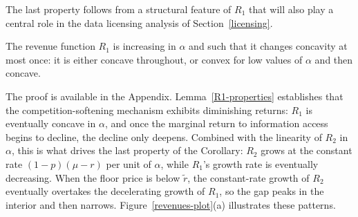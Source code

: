 \noindent The last property follows from a structural feature of $R_1$ that will also play a central role in the data licensing analysis of Section~\ref{licensing}.

\begin{lem}\label{R1-properties}
    The revenue function $R_1$ is increasing in $\alpha$ and such that it changes concavity at most once: it is either concave throughout, or convex for low values of $\alpha$ and then concave.
\end{lem}

\noindent The proof is available in the Appendix. Lemma~\ref{R1-properties} establishes that the competition-softening mechanism exhibits diminishing returns: $R_1$ is eventually concave in $\alpha$, and once the marginal return to information access begins to decline, the decline only deepens. Combined with the linearity of $R_2$ in $\alpha$, this is what drives the last property of the Corollary: $R_2$ grows at the constant rate $(1-p)(\mu - r)$ per unit of $\alpha$, while $R_1$'s growth rate is eventually decreasing. When the floor price is below $\tilde{r}$, the constant-rate growth of $R_2$ eventually overtakes the decelerating growth of $R_1$, so the gap peaks in the interior and then narrows. Figure~\ref{revenues-plot}(a) illustrates these patterns.

